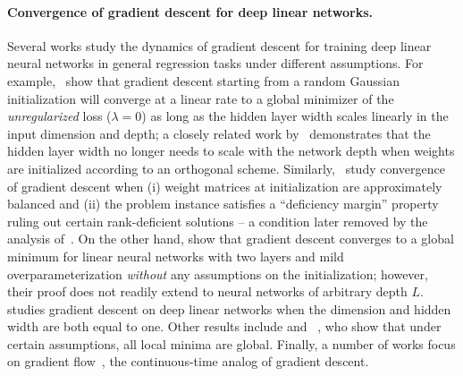 \paragraph{Convergence of gradient descent for deep linear networks.}
Several works study the dynamics of gradient descent for training deep linear neural networks in general regression tasks under different assumptions.
For example,~\citet{du2019width} show that gradient descent starting from a random Gaussian initialization will converge at a linear rate to a global minimizer of the \emph{unregularized} loss ($\lambda = 0$) as long as the hidden layer width
scales linearly in the input dimension and depth; a closely related work by~\citet{HXP20} demonstrates that the hidden layer width no longer needs to scale
with the network depth when weights are initialized according to an orthogonal
scheme.
Similarly,~\citet{arora2019convergence} study convergence of gradient descent when (i) weight matrices
at initialization are approximately balanced and (ii) the problem instance satisfies
a ``deficiency margin'' property ruling out certain rank-deficient solutions -- a condition later removed
by the analysis of~\citet{nguegnang2024convergence}.
On the other hand, \citet{xu2023linear} show that gradient descent converges to a global
minimum for linear neural networks with two layers and mild overparameterization \emph{without}
any assumptions on the initialization; however, their proof does not readily extend to
neural networks of arbitrary depth $L$.
\citet{shamir2019exponential} studies gradient descent on deep linear networks when the dimension and hidden width are both equal to one.
Other results include  \citet{kawaguchi2016deep} and ~\citet{LvB18}, who
show that under certain assumptions, all local minima are global.
Finally, a number of works focus on gradient flow~\citep{gidel2019implicit,JT19,eftekhari2020training,BRTW21,pesme2021implicit,JGS+21}, the continuous-time analog of gradient descent.

